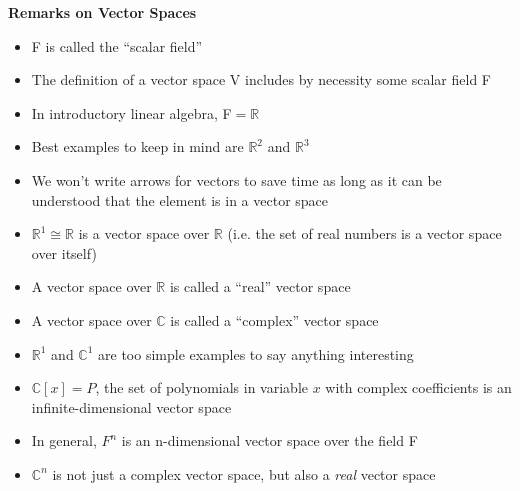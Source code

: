 \documentclass[10pt, oneside]{article}
\newcommand{\R}{\mathbb{R}}
\newcommand{\C}{\mathbb{C}}
\begin{document}
\noindent \textbf{Remarks on Vector Spaces}
\begin{itemize}
    \item F is called the ``scalar field''
    \item The definition of a vector space V includes by necessity some scalar field F
    \item In introductory linear algebra, F$= \R$
    \item Best examples to keep in mind are $\R^2$ and $\R^3$
    \item We won't write arrows for vectors to save time as long as it can be understood that the element is in a vector space
    \item $\R^1 \cong \R$ is a vector space over $\R$ (i.e. the set of real numbers is a vector space over itself)
    \item A vector space over $\R$ is called a ``real'' vector space
    \item A vector space over $\C$ is called a ``complex'' vector space
    \item $\R^{1}$ and $\C^{1}$ are too simple examples to say anything interesting
    \item $\C[x] = P$, the set of polynomials in variable $x$ with complex coefficients is an infinite-dimensional vector space
    \item In general, $F^{n}$ is an n-dimensional vector space over the field F
    \item $\C^{n}$ is not just a complex vector space, but also a \textit{real} vector space
\end{itemize}
\end{document}
